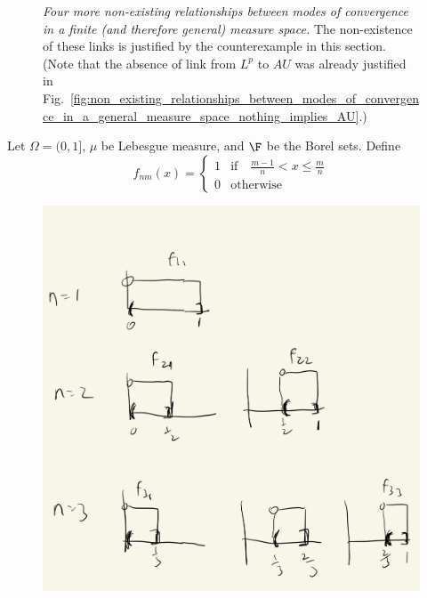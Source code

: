 \documentclass{article} %
\begin{document}
\begin{figure}[H]
\centering	
{}
\caption{ \textit{Four more non-existing relationships between modes of convergence in a finite (and therefore general) measure space.}  The non-existence of these links is justified by the counterexample in this section. (Note that the absence of link from $L^p$ to $AU$ was already justified in Fig.~\ref{fig:non_existing_relationships_between_modes_of_convergence_in_a_general_measure_space_nothing_implies_AU}.)}
\label{fig:non_existing_relationships_between_modes_of_convergence_Lp_and_measure_do_not_imply_AE_or_AU}
\end{figure}

Let $\Omega=(0,1]$, $\mu$ be Lebesgue measure, and $\F$ be the Borel sets.  Define
\[f_{nm}(x) =
\begin{cases}
1 & \text{if} \quad \frac{m-1}{n}  < x \leq \frac{m}{n} \\
0 & \text{otherwise}	
\end{cases}
 \]
 
\begin{figure}[H]
\centering
\includegraphics[width=.4\textwidth]{images/modes_of_convergence_counter_example_4}	
\caption{}
\label{fig:modes_of_convergence_counter_example_4}	
\end{figure}
\end{document}
